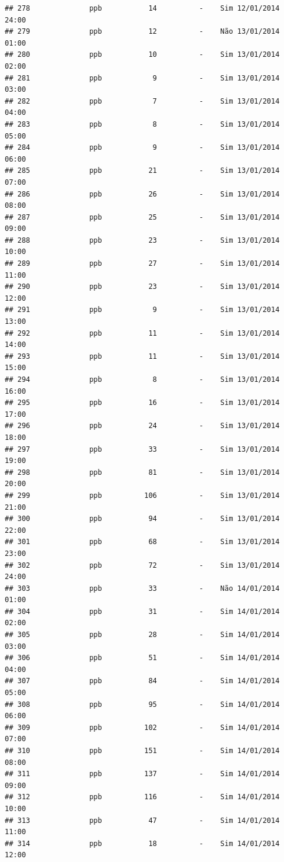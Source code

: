 \documentclass[]{book}
\begin{document}
\begin{verbatim}
## 278              ppb           14          -    Sim 12/01/2014 24:00
## 279              ppb           12          -    Não 13/01/2014 01:00
## 280              ppb           10          -    Sim 13/01/2014 02:00
## 281              ppb            9          -    Sim 13/01/2014 03:00
## 282              ppb            7          -    Sim 13/01/2014 04:00
## 283              ppb            8          -    Sim 13/01/2014 05:00
## 284              ppb            9          -    Sim 13/01/2014 06:00
## 285              ppb           21          -    Sim 13/01/2014 07:00
## 286              ppb           26          -    Sim 13/01/2014 08:00
## 287              ppb           25          -    Sim 13/01/2014 09:00
## 288              ppb           23          -    Sim 13/01/2014 10:00
## 289              ppb           27          -    Sim 13/01/2014 11:00
## 290              ppb           23          -    Sim 13/01/2014 12:00
## 291              ppb            9          -    Sim 13/01/2014 13:00
## 292              ppb           11          -    Sim 13/01/2014 14:00
## 293              ppb           11          -    Sim 13/01/2014 15:00
## 294              ppb            8          -    Sim 13/01/2014 16:00
## 295              ppb           16          -    Sim 13/01/2014 17:00
## 296              ppb           24          -    Sim 13/01/2014 18:00
## 297              ppb           33          -    Sim 13/01/2014 19:00
## 298              ppb           81          -    Sim 13/01/2014 20:00
## 299              ppb          106          -    Sim 13/01/2014 21:00
## 300              ppb           94          -    Sim 13/01/2014 22:00
## 301              ppb           68          -    Sim 13/01/2014 23:00
## 302              ppb           72          -    Sim 13/01/2014 24:00
## 303              ppb           33          -    Não 14/01/2014 01:00
## 304              ppb           31          -    Sim 14/01/2014 02:00
## 305              ppb           28          -    Sim 14/01/2014 03:00
## 306              ppb           51          -    Sim 14/01/2014 04:00
## 307              ppb           84          -    Sim 14/01/2014 05:00
## 308              ppb           95          -    Sim 14/01/2014 06:00
## 309              ppb          102          -    Sim 14/01/2014 07:00
## 310              ppb          151          -    Sim 14/01/2014 08:00
## 311              ppb          137          -    Sim 14/01/2014 09:00
## 312              ppb          116          -    Sim 14/01/2014 10:00
## 313              ppb           47          -    Sim 14/01/2014 11:00
## 314              ppb           18          -    Sim 14/01/2014 12:00

\end{verbatim}
\end{document}
